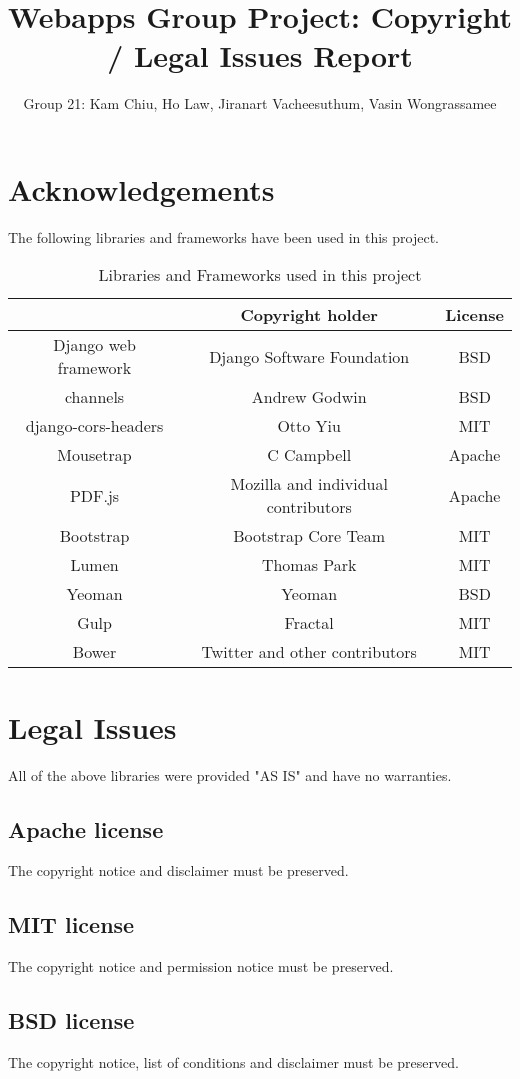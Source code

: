 \documentclass[11pt]{article}
\begin{document}
\title{Webapps Group Project: Copyright / Legal Issues Report}
\author{Group 21: Kam Chiu, Ho Law, Jiranart Vacheesuthum, Vasin Wongrassamee}

\maketitle

\section{Acknowledgements}
The following libraries and frameworks have been used in this project.

\begin{table}[h!]
  \centering
  \caption{Libraries and Frameworks used in this project}
  \begin{tabular}{|c|c|c|}
    \toprule
    & Copyright holder & License\\
    \midrule
    Django web framework & Django Software Foundation & BSD\\
    channels & Andrew Godwin & BSD\\
    django-cors-headers & Otto Yiu & MIT\\
    Mousetrap & C Campbell & Apache\\
    PDF.js & Mozilla and individual contributors & Apache\\
    Bootstrap & Bootstrap Core Team & MIT\\
    Lumen & Thomas Park & MIT\\
    Yeoman & Yeoman & BSD\\
    Gulp & Fractal & MIT\\
    Bower & Twitter and other contributors & MIT\\
    \bottomrule
  \end{tabular}
\end{table}

\section{Legal Issues}
All of the above libraries were provided "AS IS" and have no warranties.
\subsection{Apache license}
The copyright notice and disclaimer must be preserved. 
\subsection{MIT license}
The copyright notice and permission notice must be preserved.
\subsection{BSD license}
The copyright notice, list of conditions and disclaimer must be preserved. 
\end{document}
